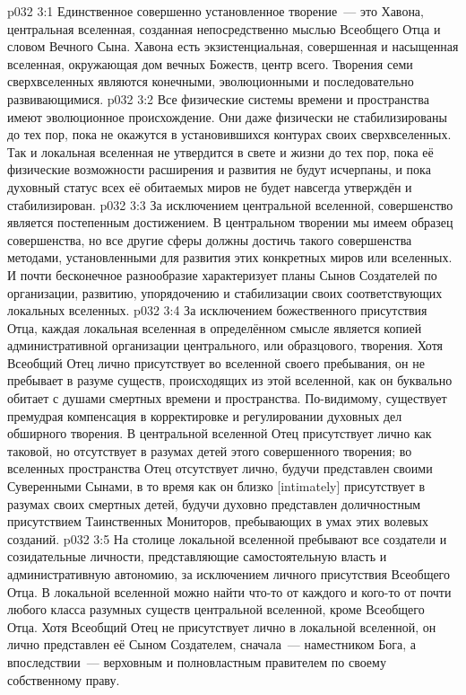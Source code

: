 \vs p032 3:1 Единственное совершенно установленное творение~--- это Хавона, центральная вселенная, созданная непосредственно мыслью Всеобщего Отца и словом Вечного Сына. Хавона есть экзистенциальная, совершенная и насыщенная вселенная, окружающая дом вечных Божеств, центр всего. Творения семи сверхвселенных являются конечными, эволюционными и последовательно развивающимися.
\vs p032 3:2 Все физические системы времени и пространства имеют эволюционное происхождение. Они даже физически не стабилизированы до тех пор, пока не окажутся в установившихся контурах своих сверхвселенных. Так и локальная вселенная не утвердится в свете и жизни до тех пор, пока её физические возможности расширения и развития не будут исчерпаны, и пока духовный статус всех её обитаемых миров не будет навсегда утверждён и стабилизирован.
\vs p032 3:3 За исключением центральной вселенной, совершенство является постепенным достижением. В центральном творении мы имеем образец совершенства, но все другие сферы должны достичь такого совершенства методами, установленными для развития этих конкретных миров или вселенных. И почти бесконечное разнообразие характеризует планы Сынов Создателей по организации, развитию, упорядочению и стабилизации своих соответствующих локальных вселенных.
\vs p032 3:4 \pc За исключением божественного присутствия Отца, каждая локальная вселенная в определённом смысле является копией административной организации центрального, или образцового, творения. Хотя Всеобщий Отец лично присутствует во вселенной своего пребывания, он не пребывает в разуме существ, происходящих из этой вселенной, как он буквально обитает с душами смертных времени и пространства. По\hyp{}видимому, существует премудрая компенсация в корректировке и регулировании духовных дел обширного творения. В центральной вселенной Отец присутствует лично как таковой, но отсутствует в разумах детей этого совершенного творения; во вселенных пространства Отец отсутствует лично, будучи представлен своими Суверенными Сынами, в то время как он близко [intimately] присутствует в разумах своих смертных детей, будучи духовно представлен доличностным присутствием Таинственных Мониторов, пребывающих в умах этих волевых созданий.
\vs p032 3:5 На столице локальной вселенной пребывают все создатели и созидательные личности, представляющие самостоятельную власть и административную автономию, за исключением личного присутствия Всеобщего Отца. В локальной вселенной можно найти что-то от каждого и кого-то от почти любого класса разумных существ центральной вселенной, кроме Всеобщего Отца. Хотя Всеобщий Отец не присутствует лично в локальной вселенной, он лично представлен её Сыном Создателем, сначала~--- наместником Бога, а впоследствии~--- верховным и полновластным правителем по своему собственному праву.
